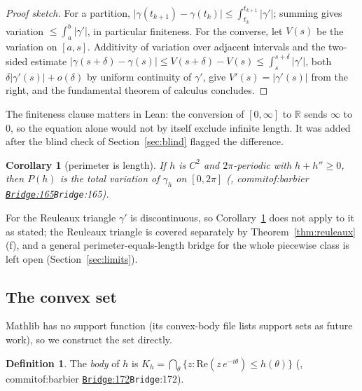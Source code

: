 \documentclass[11pt]{article}
\newtheorem{corollary}[theorem]{Corollary}
\theoremstyle{definition}
\newtheorem{definition}[theorem]{Definition}
\theoremstyle{remark}
\newcommand{\RR}{\mathbb{R}}
\newcommand{\commitof}[1]{\csname commitof:#1\endcsname}
\newcommand{\repo}[1]{https://github.com/jpbald93/#1}
\newcommand{\src}[4]{\ifcsname commitof:#1\endcsname
  \href{\repo{#1}/blob/\commitof{#1}/#2/#3.lean\#L#4}{\texttt{#3}:#4}\else\texttt{#3}:#4\fi}
\begin{document}
\begin{proof}[Proof sketch]
For a partition, $\lvert\gamma(t_{k+1})-\gamma(t_k)\rvert\le\int_{t_k}^{t_{k+1}}\lvert\gamma'\rvert$;
summing gives variation $\le\int_a^b\lvert\gamma'\rvert$, in particular finiteness. For the converse,
let $V(s)$ be the variation on $[a,s]$. Additivity of variation over adjacent intervals and the
two-sided estimate $\lvert\gamma(s+\delta)-\gamma(s)\rvert\le V(s+\delta)-V(s)\le
\int_s^{s+\delta}\lvert\gamma'\rvert$, both $\delta\lvert\gamma'(s)\rvert+o(\delta)$ by uniform
continuity of $\gamma'$, give $V'(s) = \lvert\gamma'(s)\rvert$ from the right, and the fundamental
theorem of calculus concludes.
\end{proof}

The finiteness clause matters in Lean: the conversion of $[0,\infty]$ to $\RR$ sends $\infty$ to $0$,
so the equation alone would not by itself exclude infinite length. It was added after the blind
check of Section~\ref{sec:blind} flagged the difference.

\begin{corollary}[perimeter is length]\label{cor:perlen}
If $h$ is $C^2$ and $2\pi$-periodic with $h+h''\ge 0$, then $P(h)$ is the total variation of
$\gamma_h$ on $[0,2\pi]$ (, \src{barbier}{Barbier}{Bridge}{165}).
\end{corollary}

For the Reuleaux triangle $\gamma'$ is discontinuous, so Corollary~\ref{cor:perlen} does not apply to
it as stated; the Reuleaux triangle is covered separately by Theorem~\ref{thm:reuleaux}(f), and a
general perimeter-equals-length bridge for the whole piecewise class is left open
(Section~\ref{sec:limits}).

\subsection{The convex set}

Mathlib has no support function (its convex-body file lists support sets as future work), so we
construct the set directly.

\begin{definition}
The \emph{body} of $h$ is $K_h = \bigcap_{\theta}\{z : \mathrm{Re}(z\,e^{-i\theta})\le h(\theta)\}$
(, \src{barbier}{Barbier}{Bridge}{172}).
\end{definition}
\end{document}
